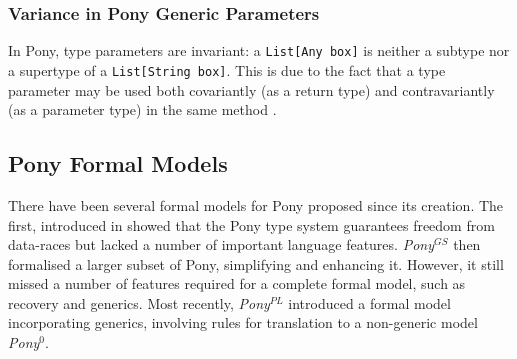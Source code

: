 \subsubsection{Variance in Pony Generic Parameters}

In Pony, type parameters are invariant: a \texttt{List[Any box]} is neither a subtype nor a supertype of a \texttt{List[String box]}. This is due to the fact that a type parameter may be used both covariantly (as a return type) and contravariantly (as a parameter type) in the same method \cite{Igarashi2001}.

\subsection{Pony Formal Models}

There have been several formal models for Pony proposed since its creation. The first, introduced in \cite{Clebsch2015} showed that the Pony type system guarantees freedom from data-races but lacked a number of important language features. \textit{Pony}$^{GS}$ \cite{Steed2016} then formalised a larger subset of Pony, simplifying and enhancing it. However, it still missed a number of features required for a complete formal model, such as recovery and generics. Most recently, \textit{Pony}$^{PL}$ \cite{Lietar2017} introduced a formal model incorporating generics, involving rules for translation to a non-generic model \textit{Pony}$^0$.
